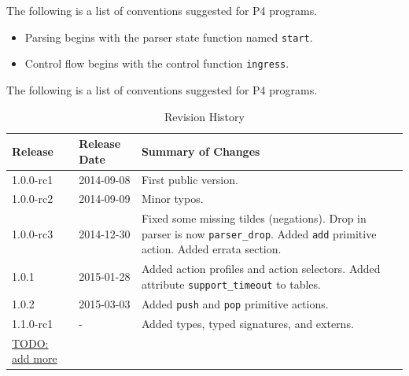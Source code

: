 \documentclass[12pt]{article}
\begin{document}
The following is a list of conventions suggested for P4 programs.

\begin{itemize}
\item
Parsing begins with the parser state function named \texttt{start}.
\item
Control flow begins with the control function \texttt{ingress}.
\end{itemize}The following is a list of conventions suggested for P4 programs.


\begin{table}[H]
\begin{center}
\begin{tabular}{| l | l | p{} |} \hline
\textbf{Release} &
\textbf{Release Date} &
\textbf{Summary of Changes} \\  \hline
1.0.0-rc1 & 2014-09-08 & First public version. \\  \hline
1.0.0-rc2 & 2014-09-09 & Minor typos. \\  \hline
1.0.0-rc3 & 2014-12-30 & Fixed some missing tildes (negations). Drop in parser is now \texttt{parser_drop}. Added \texttt{add} primitive action. Added errata section. \\  \hline
1.0.1 & 2015-01-28 & Added action profiles and action selectors. Added attribute \texttt{support_timeout} to tables. \\  \hline
1.0.2 & 2015-03-03 & Added \texttt{push} and \texttt{pop} primitive actions. \\  \hline
1.1.0-rc1 & - & Added types, typed signatures, and externs. \\  \hline 
\underline{TODO: add more} \\ \hline
\end{tabular}
\end{center}
\caption{Revision History}
\label{tab:revhistory}
\end{table}


\end{document}
